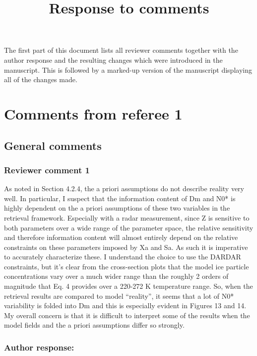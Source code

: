 \documentclass[11pt]{scrartcl}
\title{Response to comments}
\date{}
\begin{document}
\maketitle

\setlength{\parindent}{0cm}

The first part of this document lists all reviewer comments together with
the author response and the resulting changes which were introduced in the
manuscript. This is followed by a marked-up version of the manuscript displaying
all of the changes made.

\section{Comments from referee 1}

\subsection{General comments}

\subsubsection*{Reviewer comment 1}

As noted in Section 4.2.4, the a priori assumptions do not describe reality very
well. In particular, I suspect that the information content of Dm and N0* is
highly dependent on the a priori assumptions of these two variables in the
retrieval framework. Especially with a radar measurement, since Z is sensitive
to both parameters over a wide range of the parameter space, the relative
sensitivity and therefore information content will almost entirely depend on the
relative constraints on these parameters imposed by Xa and Sa. As such it is
imperative to accurately characterize these. I understand the choice to use the
DARDAR constraints, but it’s clear from the cross-section plots that the model
ice particle concentrations vary over a much wider range than the roughly 2
orders of magnitude that Eq. 4 provides over a 220-272 K temperature range. So,
when the retrieval results are compared to model “reality”, it seems that a lot
of N0* variability is folded into Dm and this is especially evident in Figures
13 and 14. My overall concern is that it is difficult to interpret some of the
results when the model fields and the a priori assumptions differ so strongly.

\subsubsection*{Author response:}
\end{document}
